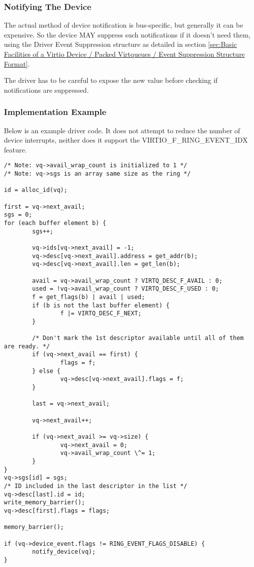 \subsubsection{Notifying The Device}\label{sec:Basic Facilities
of a Virtio Device / Packed Virtqueues / Supplying Buffers to The Device / Notifying The Device}

The actual method of device notification is bus-specific, but generally
it can be expensive.  So the device MAY suppress such notifications if it
doesn't need them, using the Driver Event Suppression structure
as detailed in section \ref{sec:Basic
Facilities of a Virtio Device / Packed Virtqueues / Event
Suppression Structure Format}.

The driver has to be careful to expose the new 
value before checking if notifications are suppressed.

\subsubsection{Implementation Example}\label{sec:Basic Facilities of a Virtio Device / Packed Virtqueues / Supplying Buffers to The Device / Implementation Example}

Below is an example driver code. It does not attempt to reduce
the number of device interrupts, neither does it support
the VIRTIO_F_RING_EVENT_IDX feature.

\begin{lstlisting}
/* Note: vq->avail_wrap_count is initialized to 1 */
/* Note: vq->sgs is an array same size as the ring */

id = alloc_id(vq);

first = vq->next_avail;
sgs = 0;
for (each buffer element b) {
        sgs++;

        vq->ids[vq->next_avail] = -1;
        vq->desc[vq->next_avail].address = get_addr(b);
        vq->desc[vq->next_avail].len = get_len(b);

        avail = vq->avail_wrap_count ? VIRTQ_DESC_F_AVAIL : 0;
        used = !vq->avail_wrap_count ? VIRTQ_DESC_F_USED : 0;
        f = get_flags(b) | avail | used;
        if (b is not the last buffer element) {
                f |= VIRTQ_DESC_F_NEXT;
        }

        /* Don't mark the 1st descriptor available until all of them are ready. */
        if (vq->next_avail == first) {
                flags = f;
        } else {
                vq->desc[vq->next_avail].flags = f;
        }

        last = vq->next_avail;

        vq->next_avail++;

        if (vq->next_avail >= vq->size) {
                vq->next_avail = 0;
                vq->avail_wrap_count \^= 1;
        }
}
vq->sgs[id] = sgs;
/* ID included in the last descriptor in the list */
vq->desc[last].id = id;
write_memory_barrier();
vq->desc[first].flags = flags;

memory_barrier();

if (vq->device_event.flags != RING_EVENT_FLAGS_DISABLE) {
        notify_device(vq);
}

\end{lstlisting}


